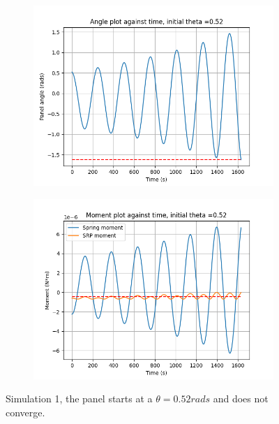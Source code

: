\begin{figure}[!htb]
\centering
\begin{subfigure}{0.5\textwidth}
  \centering
  \includegraphics[width=1\linewidth]{images/first/theta_plot.png}
  \label{fig:1_theta}
\end{subfigure}%
\begin{subfigure}{.5\textwidth}
  \centering
  \includegraphics[width=1\linewidth]{images/first/moment_plot.png}
  \label{fig:1_moment}
\end{subfigure}
\caption{Simulation 1, the panel starts at a $\theta = 0.52 rads$ and does not converge.}
\label{fig:1_results}
\end{figure}



